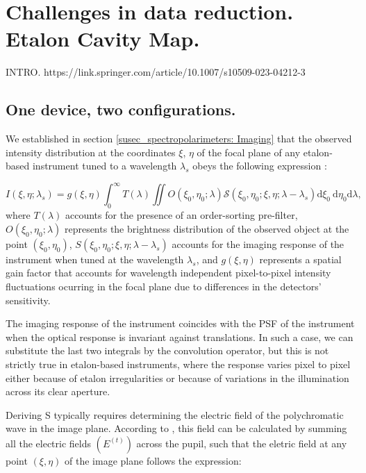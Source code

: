 \chapter{\label{CH:challenges}Challenges in data reduction. Etalon Cavity Map.}

INTRO.
https://link.springer.com/article/10.1007/s10509-023-04212-3

\section{One device, two configurations.}

We established in section \ref{susec_spectropolarimeters: Imaging} that the observed intensity distribution at the coordinates $\xi$, $\eta$ of the focal plane of any etalon-based instrument tuned to a wavelength $\lambda_s$ obeys the following expression \citep{franI}: 

\begin{equation}
    I\left(\xi, \eta ; \lambda_{s}\right)=g(\xi, \eta)\int_{0}^{\infty} T(\lambda) \iint  O\left(\xi_0, \eta_0 ; \lambda\right)  \mathcal{S}\left(\xi_0, \eta_0; \xi , \eta; \lambda-\lambda_{s}\right)  \mathrm{d} \xi_{0} \mathrm{~d} \eta_{0}\mathrm{d} \lambda ,
    \label{eq_etalon_theory: General_Intensity}
\end{equation}
where $T(\lambda)$ accounts for the presence of an order-sorting pre-filter, $O\left(\xi_0, \eta_0 ; \lambda\right)$ represents the brightness distribution of the observed object at the point $\left(\xi_0, \eta_0\right)$, $S\left(\xi_0, \eta_0; \xi , \eta; \lambda-\lambda_{s}\right)$ accounts for the imaging response of the instrument when tuned at the wavelength $\lambda_{s}$, and $g(\xi, \eta)$ represents a spatial gain factor that accounts for wavelength independent pixel-to-pixel intensity fluctuations ocurring in the focal plane due to differences in the detectors' sensitivity. 

The imaging response of the instrument coincides with the PSF of the instrument when the optical response is invariant against translations. In such a case, we can substitute the last two integrals by the convolution operator, but this is not strictly true in etalon-based instruments, where the response varies pixel to pixel either because of etalon irregularities or because of variations in the illumination across its clear aperture. 

Deriving S typically requires determining the electric field of the polychromatic wave in the image plane. According to \cite{franI}, this field can be calculated by summing all the electric fields $(E^{(t)})$ across the pupil, such that the eletric field at any point $(\xi, \eta)$ of the image plane follows the expression:

